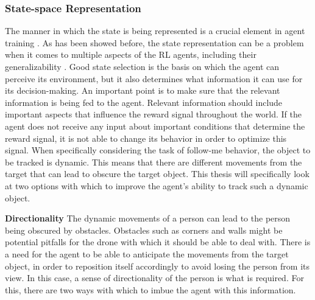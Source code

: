 \subsubsection{State-space Representation}
The manner in which the state is being represented is a crucial element in agent training 
\cite{staterepresentation}.
As has been showed before, the state representation can be a problem when it comes to 
multiple aspects of the RL agents, including their generalizability 
\cite{DroneRLUsingTransferLearning}.
Good state selection is the basis on which the agent can perceive its environment, but it
also determines what information it can use for its decision-making. An important point is 
to make sure that the relevant information is being fed to the agent. Relevant information 
should include important aspects that influence the reward signal throughout the world. If 
the agent does not receive any input about important conditions that determine the reward 
signal, it is not able to change its behavior in order to optimize this signal. When 
specifically considering the task of follow-me behavior, the object to be tracked is dynamic. 
This means that there are different movements from the target that can lead to obscure the target object. 
This thesis will specifically look at two options with which to improve the agent's ability 
to track such a dynamic object. \newline

\noindent
\textbf{Directionality} \label{directionality} \newline 
The dynamic movements of a person can lead to the person being obscured by obstacles. 
Obstacles such as corners and walls
might be potential pitfalls for the drone with which it should be able to deal with. 
There is a need for the agent to be able to anticipate the movements from the target object, 
in order to reposition itself accordingly to avoid losing the person from its view. In this case, 
a sense of directionality of the 
person is what is required. For this, there are two ways with which to imbue the agent 
with this information. 

